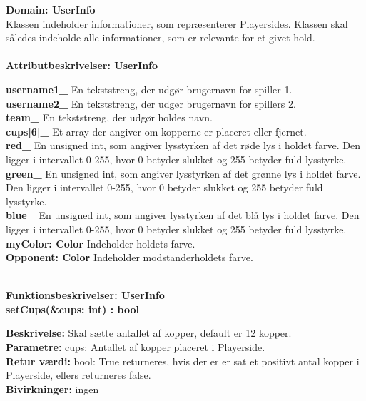 \documentclass[Arkitektur/System_main.tex]{subfiles}
\begin{document}
{\large\textbf{Domain: UserInfo}}\\
Klassen indeholder informationer, som repræsenterer Playersides. Klassen skal således indeholde alle informationer, som er relevante for et givet hold.\\
\\{\large\textbf{Attributbeskrivelser: UserInfo}}
\begin{adjustwidth}{1cm}{0pt}
\textbf{username1\_} En tekststreng, der udgør brugernavn for spiller 1. \\[0.2cm]
\textbf{username2\_} En tekststreng, der udgør brugernavn for spillers 2. \\[0.2cm]
\textbf{team\_} En tekststreng, der udgør holdes navn. \\[0.2cm]
\textbf{cups[6]\_} Et array der angiver om kopperne er placeret eller fjernet. \\[0.2cm]
\textbf{red\_} En unsigned int, som angiver lysstyrken af det røde lys i holdet farve. Den ligger i intervallet 0-255, hvor 0 betyder slukket og 255 betyder fuld lysstyrke. \\[0.2cm]
\textbf{green\_} En unsigned int, som angiver lysstyrken af det grønne lys i holdet farve. Den ligger i intervallet 0-255, hvor 0 betyder slukket og 255 betyder fuld lysstyrke. \\[0.2cm]
\textbf{blue\_} En unsigned int, som angiver lysstyrken af det blå lys i holdet farve. Den ligger i intervallet 0-255, hvor 0 betyder slukket og 255 betyder fuld lysstyrke. \\[0.2cm]
\textbf{myColor: Color} Indeholder holdets farve.  \\[0.2cm]
\textbf{Opponent: Color} Indeholder modstanderholdets farve.  \\[0.2cm]
\end{adjustwidth}
\\
{\large\textbf{Funktionsbeskrivelser: UserInfo}}\\[0.2cm]
\textbf{setCups(\&cups: int) : bool}
\begin{adjustwidth}{1cm}{0pt}
\textbf{Beskrivelse:} Skal sætte antallet af kopper, default er 12 kopper.\\
\textbf{Parametre:} cups: Antallet af kopper placeret i Playerside. \\[0.2cm]
\textbf{Retur værdi:} bool: True returneres, hvis der er er sat et positivt antal kopper i Playerside, ellers returneres false. \\[0.2cm]
\textbf{Bivirkninger:} ingen \\[0.2cm]
\end{adjustwidth}
\end{document}
